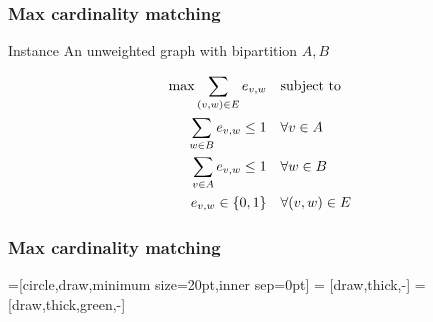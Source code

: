 \begin{frame}[fragile]
\frametitle{Max cardinality matching}

\begin{block}{Instance}
An unweighted graph \g with bipartition \(A,B\)
\end{block}

\begin{align}
  \max \sum_{(v,w)\in E} e_{v,w}                  \quad&\text{subject to }\\
  \sum_{w\in B} e_{v,w} \le 1 \quad& \forall v\in A           \\
  \sum_{v\in A} e_{v,w} \le 1 \quad& \forall w\in B           \\
  e_{v,w}\in \{0,1\}         \quad& \forall (v,w)\in E \notag
\end{align}
\end{frame}

\begin{frame}[fragile]
\frametitle{Max cardinality matching}

=[circle,draw,minimum size=20pt,inner sep=0pt]
 = [draw,thick,-]
 = [draw,thick,green,-]
\begin{figure}
\end{figure}
\end{frame}


